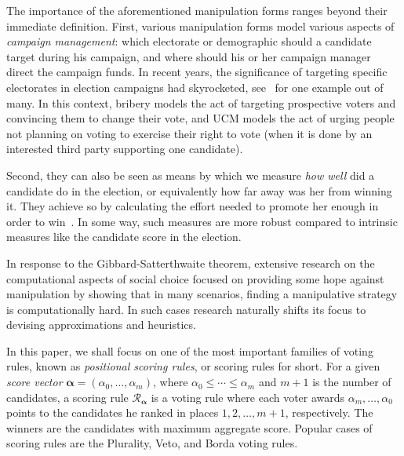 \documentclass[letterpaper]{article} %
\theoremstyle{definition}
\newcommand\vecgreek{\bm}
\newcommand{\veca}{\vecgreek{\alpha}}
\newcommand{\Ra}{\mathcal{R}_{\veca}}
\begin{document}
The importance of the aforementioned manipulation forms ranges beyond their immediate definition. First, various manipulation forms model various aspects of \emph{campaign management}:  which electorate or demographic should a candidate target during his campaign, and where should his or her campaign manager direct the campaign funds. In recent years, the significance of targeting specific electorates in election campaigns had skyrocketed,
see~\cite{hillary} for one example out of many. In this context, bribery models the act of targeting prospective voters and convincing them to change their vote, and UCM models the act of urging people not planning on voting to exercise their right to vote (when it is done by an interested third party supporting one candidate).


Second, they can also be seen as means by which we measure \emph{how well} did a candidate do in the election, or equivalently how far away was her from winning it. They achieve so by calculating the effort needed to promote her enough in order to win~\cite{DBLP:conf/atal/FaliszewskiST17}. In some way, such measures are more robust compared to intrinsic measures like the candidate score in the election.

In response to the Gibbard-Satterthwaite theorem, extensive research on the computational aspects of social choice focused on providing some hope against manipulation
by showing that in many scenarios, finding a manipulative strategy is computationally hard. In such cases research naturally shifts its focus to  devising  approximations and heuristics.

In this paper, we shall focus on one of the most important families of voting rules, known as \emph{positional scoring rules}, or scoring rules for short. For a given \emph{score vector} $\veca= (\alpha_{0},\ldots,\alpha_m)$, where $\alpha_{0}\leq \cdots \leq \alpha_m$ and $m+1$ is the number of candidates, a scoring rule $\Ra$ is a voting rule where each voter awards $\alpha_m,\ldots,\alpha_{0}$ points to the candidates he ranked in places $1,2,\ldots,m+1$, respectively.
The winners are the candidates with maximum aggregate score.
Popular cases of scoring rules are the Plurality, Veto, and Borda voting rules.
\end{document}
